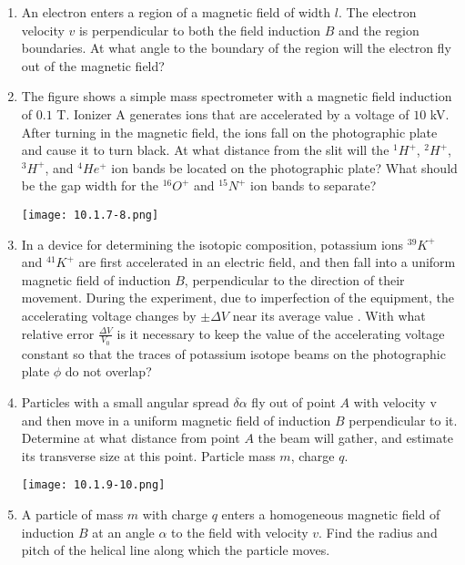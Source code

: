 \documentclass{article}
\begin{document}
\begin{enumerate}[label=10.1.\arabic*]
\item An electron enters a region of a magnetic field of width $l$. The electron velocity $v$ is perpendicular to both the field induction $B$ and the region boundaries. At what angle to the boundary of the region will the electron fly out of the magnetic field?

\item The figure shows a simple mass spectrometer with a magnetic field induction of $0.1$ T. Ionizer A generates ions that are accelerated by a voltage of $10$ kV. After turning in the magnetic field, the ions fall on the photographic plate and cause it to turn black. At what distance from the slit will the ${}^1H^+$, ${}^2H^+$, ${}^3H^+$, and ${}^4He^+$ ion bands be located on the photographic plate? What should be the gap width for the $^16O^+$ and ${}^{15}N^+$ ion bands to separate? 

\begin{center}
    \texttt{[image: 10.1.7-8.png]}
\end{center}


\item In a device for determining the isotopic composition, potassium ions ${}^{39}K^+$ and ${}^{41}K^+$ are first accelerated in an electric field, and then fall into a uniform magnetic field of induction $B$, perpendicular to the direction of their movement. During the experiment, due to imperfection of the equipment, the accelerating voltage changes by $\pm \Delta V$ near its average value . With what relative error $\frac{\Delta V}{V_0}$ is it necessary to keep the value of the accelerating voltage constant so that the traces of potassium isotope beams on the photographic plate $\phi$ do not overlap?

\item Particles with a small angular spread $\delta \alpha$ fly out of point $A$ with velocity v and then move in a uniform magnetic field of induction $B$ perpendicular to it. Determine at what distance from point $A$ the beam will gather, and estimate its transverse size at this point. Particle mass $m$, charge $q$.

\begin{center}
    \texttt{[image: 10.1.9-10.png]}
\end{center}

\item A particle of mass $m$ with charge $q$ enters a homogeneous magnetic field of induction $B$ at an angle $\alpha$ to the field with velocity $v$. Find the radius and pitch of the helical line along which the particle moves.


\end{enumerate}
\end{document}

